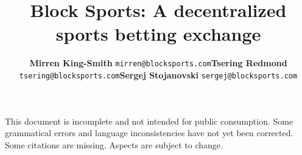 \documentclass{article}
\begin{document}
\noindent
This document is incomplete and not intended for public consumption. Some grammatical errors and language inconsistencies have not yet been corrected. Some citations are missing. Aspects are subject to change.

\pagebreak

\title{{\bfseries Block Sports}: A decentralized sports betting exchange}
\renewcommand{\arraystretch}{1}
\author{
	\footnotesize
	\hspace*{+.4cm}
	\begin{tabularx}{\textwidth}{ p{3.75cm} p{3.75cm} p{3.75cm}}
		\begin{center}
		\item {\bfseries Mirren King-Smith} \texttt{mirren@blocksports.com}
	 	\end{center} &
	 	\begin{center}
		\item {\bfseries Tsering Redmond} \texttt{tsering@blocksports.com}
	 	\end{center} &
	 	\begin{center}
		\item {\bfseries Sergej Stojanovski} \texttt{sergej@blocksports.com}
	 	\end{center}
	\end{tabularx}
}

\date{}

\maketitle
\renewcommand{\arraystretch}{2}
\end{document}
